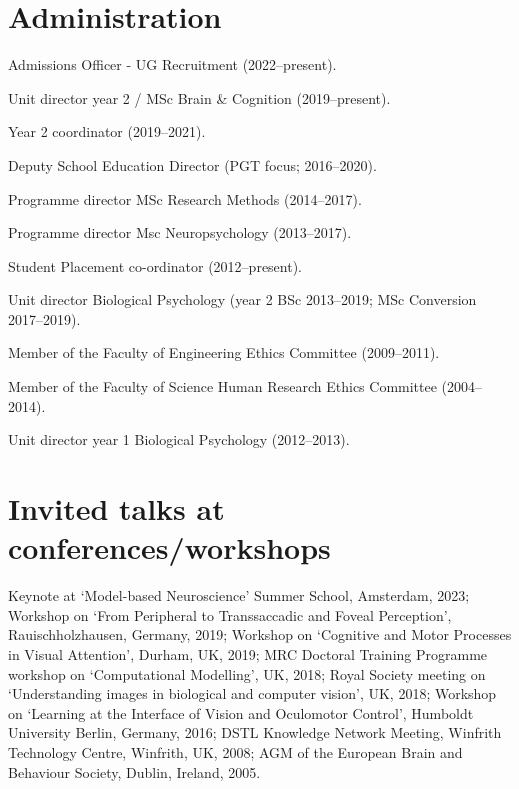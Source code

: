 \documentclass[a4paper, 10pt]{article}
\renewenvironment{itemize}{
  \begin{list}{}{
    \setlength{\leftmargin}{1.5em}
  }
}{
  \end{list}
}
\begin{document}
\section*{Administration}
\begin{itemize}
\item Admissions Officer - UG Recruitment (2022--present).
\item Unit director year 2 / MSc Brain \& Cognition (2019--present).
\item Year 2 coordinator (2019--2021).
\item Deputy School Education Director (PGT focus; 2016--2020).
\item Programme director MSc Research Methods (2014--2017).
\item Programme director Msc Neuropsychology (2013--2017).
\item Student Placement co-ordinator (2012--present).
\item Unit director Biological Psychology (year 2 BSc 2013--2019; MSc Conversion 2017--2019).
\item Member of the Faculty of Engineering Ethics Committee (2009--2011).
\item Member of the Faculty of Science Human Research Ethics Committee (2004--2014).
\item Unit director year 1 Biological Psychology (2012--2013).
\end{itemize}

\section*{Invited talks at conferences/workshops}
\begin{itemize}
\item Keynote at `Model-based Neuroscience' Summer School, Amsterdam, 2023; Workshop on `From Peripheral to Transsaccadic and Foveal Perception', Rauischholzhausen, Germany, 2019; Workshop on `Cognitive and Motor Processes in Visual Attention', Durham, UK, 2019; MRC Doctoral Training Programme workshop on `Computational Modelling', UK, 2018; Royal Society meeting on `Understanding images in biological and computer vision', UK, 2018; Workshop on `Learning at the Interface of Vision and Oculomotor Control', Humboldt University Berlin, Germany, 2016; DSTL Knowledge Network Meeting, Winfrith Technology Centre, Winfrith, UK, 2008; AGM of the European Brain and Behaviour Society, Dublin, Ireland, 2005.
\end{itemize}
\end{document}

